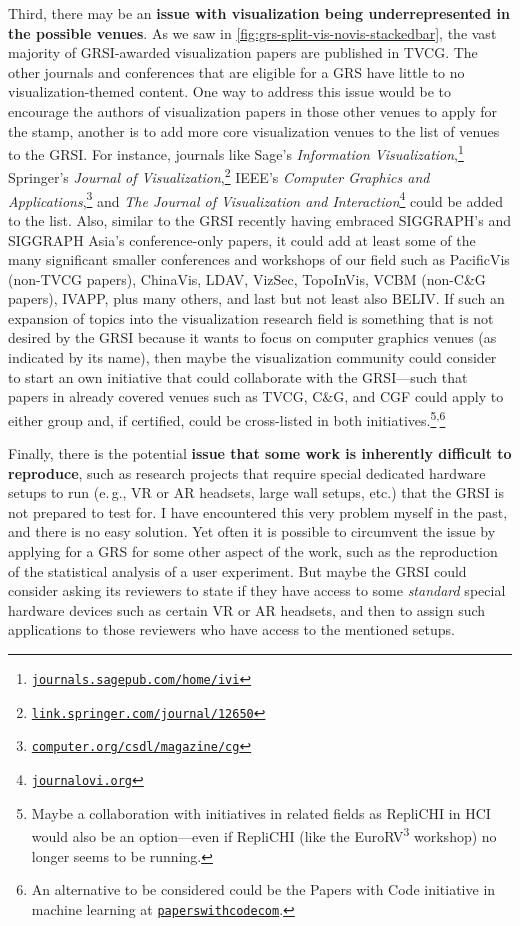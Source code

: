 \documentclass[conference,svgnames]{vgtc}                     %
\newcommand{\eg}{e.\,g.}
\begin{document}
Third, there may be an \textbf{issue with visualization being underrepresented in the possible venues}. As we saw in \autoref{fig:grs-split-vis-novis-stackedbar}, the vast majority of GRSI-awarded visualization papers are published in TVCG. The other journals and conferences that are eligible for a GRS have little to no visualization-themed content. One way to address this issue would be to encourage the authors of visualization papers in those other venues to apply for the stamp, another is to add more core visualization venues to the list of venues to the GRSI. For instance, journals like Sage's \emph{Information Visualization},\footnote{\href{https://journals.sagepub.com/home/ivi}{\texttt{journals.sagepub.com/home/ivi}}} Springer's \emph{Journal of Visualization},\footnote{\href{https://link.springer.com/journal/12650}{\texttt{link.springer.com/journal/12650}}} IEEE's \emph{Computer Graphics and Applications},\footnote{\href{https://www.computer.org/csdl/magazine/cg}{\texttt{computer.org/csdl/magazine/cg}}} and \emph{The Journal of Visualization and Interaction}\footnote{\href{https://www.journalovi.org/}{\texttt{journalovi.org}}} could be added to the list. Also, similar to the GRSI recently having embraced SIGGRAPH's and SIGGRAPH Asia's conference-only papers, it could add at least some of the many significant smaller conferences and workshops of our field such as PacificVis (non-TVCG papers), ChinaVis, LDAV, VizSec, TopoInVis, VCBM (non-C\&G papers), IVAPP, plus many others, and last but not least also BELIV. If such an expansion of topics into the visualization research field is something that is not desired by the GRSI because it wants to focus on computer graphics venues (as indicated by its name), then maybe the visualization community could consider to start an own initiative that could collaborate with the GRSI---such that papers in already covered venues such as TVCG, C\&G, and CGF could apply to either group and, if certified, could be cross-listed in both initiatives.\footnote{Maybe a collaboration with initiatives in related fields as RepliCHI in HCI \cite{Wilson:2012:RCF,Wilson:2013:RW,Wilson:2014:RW2} would also be an option---even if RepliCHI (like the EuroRV\textsuperscript{3} workshop) no longer seems to be running.}\textsuperscript{,}\footnote{An alternative to be considered could be the Papers with Code initiative in machine learning at \href{https://paperswithcode.com/}{\texttt{paperswithcodecom}}.}

Finally, there is the potential \textbf{issue that some work is inherently difficult to reproduce}, such as research projects that require special dedicated hardware setups to run (\eg, VR or AR headsets, large wall setups, etc.) that the GRSI is not prepared to test for. I have encountered this very problem myself in the past, and there is no easy solution. Yet often it is possible to circumvent the issue by applying for a GRS for some other aspect of the work, such as the reproduction of the statistical analysis of a user experiment. But maybe the GRSI could consider asking its reviewers to state if they have access to some \emph{standard} special hardware devices such as certain VR or AR headsets, and then to assign such applications to those reviewers who have access to the mentioned setups.
\end{document}
